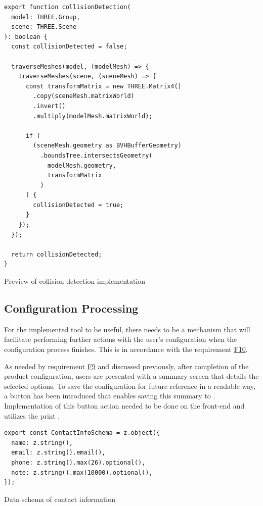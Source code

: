 \begin{listing}[h]
\begin{verbatim}
export function collisionDetection(
  model: THREE.Group,
  scene: THREE.Scene
): boolean {
  const collisionDetected = false;

  traverseMeshes(model, (modelMesh) => {
    traverseMeshes(scene, (sceneMesh) => {
      const transformMatrix = new THREE.Matrix4()
        .copy(sceneMesh.matrixWorld)
        .invert()
        .multiply(modelMesh.matrixWorld);

      if (
        (sceneMesh.geometry as BVHBufferGeometry)
          .boundsTree.intersectsGeometry(
            modelMesh.geometry,
            transformMatrix
          )
      ) {
        collisionDetected = true;
      }
    });
  });

  return collisionDetected;
}
\end{verbatim}
\caption{Preview of collision detection implementation}
\label{lisiting:impl-collisiondetection}
\end{listing}


\subsection{Configuration Processing}

For the implemented tool to be useful, there needs to be a mechanism that will facilitate performing further actions with the user's configuration when the configuration process finishes. This is in accordance with the requirement \hyperref[itm:F10]{F10}.

As needed by requirement \hyperref[itm:F9]{F9} and discussed previously, after completion of the product configuration, users are presented with a summary screen that details the selected options. To save the configuration for future reference in a readable way, a button has been introduced that enables saving this summary to . Implementation of this button action needed to be done on the front-end and utilizes the  print .

\begin{listing}[h]
\begin{verbatim}
export const ContactInfoSchema = z.object({
  name: z.string(),
  email: z.string().email(),
  phone: z.string().max(26).optional(),
  note: z.string().max(10000).optional(),
});
\end{verbatim}
\caption{Data schema of contact information}
\label{listing:schema-contactinformation}
\end{listing}

